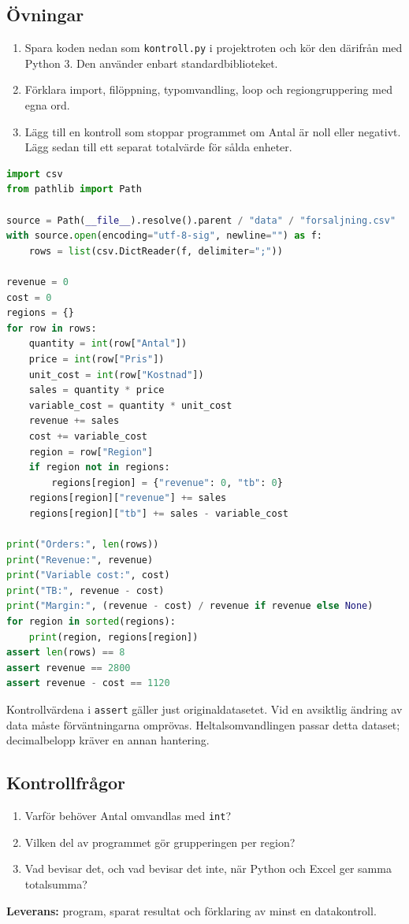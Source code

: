 \documentclass[11pt,a4paper]{article}
\begin{document}
\subsection*{Övningar}
\begin{enumerate}
\item Spara koden nedan som \texttt{kontroll.py} i projektroten och kör den därifrån med Python 3. Den använder enbart standardbiblioteket.
\item Förklara import, filöppning, typomvandling, loop och regiongruppering med egna ord.
\item Lägg till en kontroll som stoppar programmet om Antal är noll eller negativt. Lägg sedan till ett separat totalvärde för sålda enheter.
\end{enumerate}
\begin{lstlisting}[language=Python]
import csv
from pathlib import Path

source = Path(__file__).resolve().parent / "data" / "forsaljning.csv"
with source.open(encoding="utf-8-sig", newline="") as f:
    rows = list(csv.DictReader(f, delimiter=";"))

revenue = 0
cost = 0
regions = {}
for row in rows:
    quantity = int(row["Antal"])
    price = int(row["Pris"])
    unit_cost = int(row["Kostnad"])
    sales = quantity * price
    variable_cost = quantity * unit_cost
    revenue += sales
    cost += variable_cost
    region = row["Region"]
    if region not in regions:
        regions[region] = {"revenue": 0, "tb": 0}
    regions[region]["revenue"] += sales
    regions[region]["tb"] += sales - variable_cost

print("Orders:", len(rows))
print("Revenue:", revenue)
print("Variable cost:", cost)
print("TB:", revenue - cost)
print("Margin:", (revenue - cost) / revenue if revenue else None)
for region in sorted(regions):
    print(region, regions[region])
assert len(rows) == 8
assert revenue == 2800
assert revenue - cost == 1120
\end{lstlisting}
Kontrollvärdena i \texttt{assert} gäller just originaldatasetet. Vid en avsiktlig ändring av data måste förväntningarna omprövas. Heltalsomvandlingen passar detta dataset; decimalbelopp kräver en annan hantering.
\subsection*{Kontrollfrågor}
\begin{enumerate}
\item Varför behöver Antal omvandlas med \texttt{int}?
\item Vilken del av programmet gör grupperingen per region?
\item Vad bevisar det, och vad bevisar det inte, när Python och Excel ger samma totalsumma?
\end{enumerate}
\textbf{Leverans:} program, sparat resultat och förklaring av minst en datakontroll.
\end{document}
